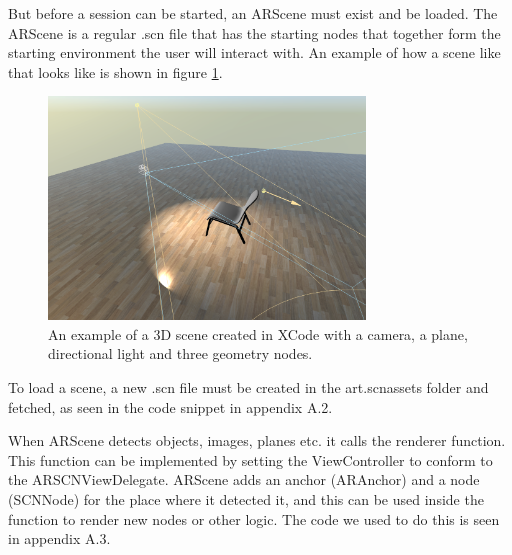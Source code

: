 But before a session can be started, an ARScene must exist and be loaded. The ARScene is a regular .scn file that has the starting nodes that together form the starting
environment the user will interact with. An example of how a scene like that looks like is shown in figure \ref{fig:3dsceneImage}.

\begin{figure}[hbtp]
\begin{center}
\includegraphics[width = 0.75\textwidth]{./Images/3dscene.jpg} 
\caption{An example of a 3D scene created in XCode with a camera, a plane, directional light and three geometry nodes.}
\label{fig:3dsceneImage}
\end{center}
\end{figure}

To load a scene, a new .scn file must be created in the art.scnassets folder and fetched, as seen in the code snippet in appendix A.2.


When ARScene detects objects, images, planes etc. it calls the renderer function. This function can be implemented by setting the ViewController to conform to the ARSCNViewDelegate. ARScene adds an anchor (ARAnchor) and a node (SCNNode) for the place where it detected it, and this can be used inside the function to render new nodes or other logic. The code we used to do this is seen in appendix A.3.


\newpage